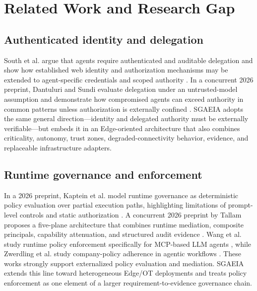 \documentclass[11pt]{article}
\newcommand{\sgaeia}{\textsc{SGAEIA}}
\begin{document}
\section{Related Work and Research Gap}
\subsection{Authenticated identity and delegation}
South et al. argue that agents require authenticated and auditable delegation and show how established web identity and authorization mechanisms may be extended to agent-specific credentials and scoped authority \cite{south2025authenticateddelegation}. In a concurrent 2026 preprint, Dantuluri and Sundi evaluate delegation under an untrusted-model assumption and demonstrate how compromised agents can exceed authority in common patterns unless authorization is externally confined \cite{dantuluri2026delegationwithouttrust}. \sgaeia{} adopts the same general direction---identity and delegated authority must be externally verifiable---but embeds it in an Edge-oriented architecture that also combines criticality, autonomy, trust zones, degraded-connectivity behavior, evidence, and replaceable infrastructure adapters.

\subsection{Runtime governance and enforcement}
In a 2026 preprint, Kaptein et al. model runtime governance as deterministic policy evaluation over partial execution paths, highlighting limitations of prompt-level controls and static authorization \cite{kaptein2026policiespaths}. A concurrent 2026 preprint by Tallam proposes a five-plane architecture that combines runtime mediation, composite principals, capability attenuation, and structured audit evidence \cite{tallam2026fiveplane}. Wang et al. study runtime policy enforcement specifically for MCP-based LLM agents \cite{wang2026runtimepep}, while Zwerdling et al. study company-policy adherence in agentic workflows \cite{zwerdling2025policyadherence}. These works strongly support externalized policy evaluation and mediation. \sgaeia{} extends this line toward heterogeneous Edge/OT deployments and treats policy enforcement as one element of a larger requirement-to-evidence governance chain.
\end{document}
